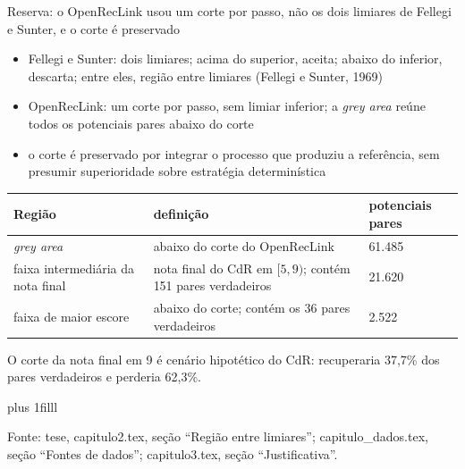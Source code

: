 \documentclass[aspectratio=169,11pt]{beamer}
\let\ressalvatexto\relax
\newcommand{\fontealign}{\raggedright}
\newcommand{\fonte}[2][tese, ]{\par\vskip 0pt plus 1filll
  \ifx\ressalvatexto\relax\else{\raggedright\footnotesize\color{black!70}\textit{Ressalva:} \ressalvatexto\par}\vskip 3pt\fi
  {\fontealign\tiny\color{black!65}Fonte: #1#2.\par}\vskip 3pt\global\let\ressalvatexto\relax}
\newcommand{\itens}[1]{\begin{itemize}#1\end{itemize}}
\begin{document}
\begin{frame}[label=R03]{Reserva: o OpenRecLink usou um corte por passo, não os dois limiares de Fellegi e Sunter, e o corte é preservado}
\footnotesize
\itens{\item Fellegi e Sunter: dois limiares; acima do superior, aceita; abaixo do inferior, descarta; entre eles, região entre limiares (Fellegi e Sunter, 1969)
\item OpenRecLink: um corte por passo, sem limiar inferior; a \textit{grey area} reúne todos os potenciais pares abaixo do corte
\item o corte é preservado por integrar o processo que produziu a referência, sem presumir superioridade sobre estratégia determinística}
\vspace{2pt}
\renewcommand{\arraystretch}{0.85}
\begin{center}
\begin{tabular}{L{.3\textwidth}L{.4\textwidth}L{.2\textwidth}}
\toprule
Região & definição & potenciais pares \\
\midrule
\textit{grey area} & abaixo do corte do OpenRecLink & 61.485 \\
faixa intermediária da nota final & nota final do CdR em $[5,9)$; contém 151 pares verdadeiros & 21.620 \\
faixa de maior escore & abaixo do corte; contém os 36 pares verdadeiros & 2.522 \\
\bottomrule
\end{tabular}
\end{center}
O corte da nota final em 9 é cenário hipotético do CdR: recuperaria 37,7\% dos pares verdadeiros e perderia 62,3\%.
\fonte{capitulo2.tex, seção ``Região entre limiares''; capitulo\_dados.tex, seção ``Fontes de dados''; capitulo3.tex, seção ``Justificativa''}
\end{frame}
\end{document}
